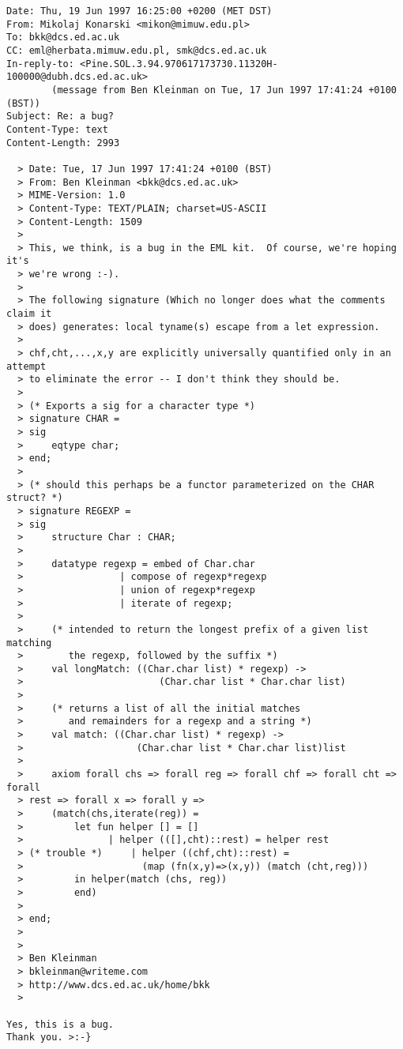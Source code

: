 \documentclass[12pt,a4paper]{article}
\begin{document}
{\small\begin{verbatim}
Date: Thu, 19 Jun 1997 16:25:00 +0200 (MET DST)
From: Mikolaj Konarski <mikon@mimuw.edu.pl>
To: bkk@dcs.ed.ac.uk
CC: eml@herbata.mimuw.edu.pl, smk@dcs.ed.ac.uk
In-reply-to: <Pine.SOL.3.94.970617173730.11320H-100000@dubh.dcs.ed.ac.uk>
        (message from Ben Kleinman on Tue, 17 Jun 1997 17:41:24 +0100 (BST))
Subject: Re: a bug?
Content-Type: text
Content-Length: 2993

  > Date: Tue, 17 Jun 1997 17:41:24 +0100 (BST)
  > From: Ben Kleinman <bkk@dcs.ed.ac.uk>
  > MIME-Version: 1.0
  > Content-Type: TEXT/PLAIN; charset=US-ASCII
  > Content-Length: 1509
  > 
  > This, we think, is a bug in the EML kit.  Of course, we're hoping it's
  > we're wrong :-).
  > 
  > The following signature (Which no longer does what the comments claim it
  > does) generates: local tyname(s) escape from a let expression.
  > 
  > chf,cht,...,x,y are explicitly universally quantified only in an attempt
  > to eliminate the error -- I don't think they should be.
  > 
  > (* Exports a sig for a character type *)
  > signature CHAR =
  > sig
  >     eqtype char;
  > end;
  > 
  > (* should this perhaps be a functor parameterized on the CHAR struct? *)
  > signature REGEXP =
  > sig
  >     structure Char : CHAR;
  > 
  >     datatype regexp = embed of Char.char
  >                 | compose of regexp*regexp
  >                 | union of regexp*regexp
  >                 | iterate of regexp;
  > 
  >     (* intended to return the longest prefix of a given list matching
  >        the regexp, followed by the suffix *)
  >     val longMatch: ((Char.char list) * regexp) -> 
  >                        (Char.char list * Char.char list)
  >     
  >     (* returns a list of all the initial matches 
  >        and remainders for a regexp and a string *)
  >     val match: ((Char.char list) * regexp) -> 
  >                    (Char.char list * Char.char list)list
  >     
  >     axiom forall chs => forall reg => forall chf => forall cht => forall
  > rest => forall x => forall y =>
  >     (match(chs,iterate(reg)) =
  >         let fun helper [] = []
  >               | helper (([],cht)::rest) = helper rest
  > (* trouble *)     | helper ((chf,cht)::rest) = 
  >                     (map (fn(x,y)=>(x,y)) (match (cht,reg))) 
  >         in helper(match (chs, reg))
  >         end)
  >     
  > end;
  > 
  > 
  > Ben Kleinman
  > bkleinman@writeme.com
  > http://www.dcs.ed.ac.uk/home/bkk
  > 

Yes, this is a bug.
Thank you. >:-}


\end{verbatim}}
\end{document}
